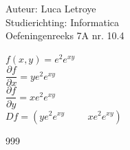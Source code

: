 \documentclass[a4paper]{article}
\begin{document}
  
\noindent \large Auteur: Luca Letroye \\
\noindent \large Studierichting: Informatica\\
\noindent \large Oefeningenreeks 7A nr. 10.4\\

\medskip
\normalsize

$f(x,y) = e^2e^{xy}$\\

$\dfrac{\partial f}{\partial x} = ye^2e^{xy}$\\

$\dfrac{\partial f}{\partial y} = xe^2e^{xy}$\\

$Df = (ye^2e^{xy} \hspace{1cm} xe^2e^{xy})$\\






\begin{thebibliography}{999}
\end{thebibliography}
\end{document}
